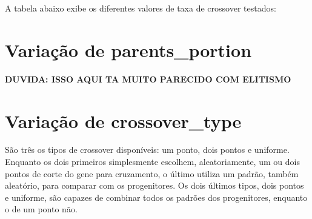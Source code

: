 \documentclass[12pt]{article}
\begin{document}
A tabela abaixo exibe os diferentes valores de taxa de crossover testados:

\section{Variação de parents\_portion}

\textbf{DUVIDA: ISSO AQUI TA MUITO PARECIDO COM ELITISMO}

\section{Variação de crossover\_type}

São três os tipos de crossover disponíveis: um ponto, dois pontos e uniforme. Enquanto os dois primeiros simplesmente escolhem, aleatoriamente, um ou dois pontos de corte do gene para cruzamento, o último utiliza um padrão, também aleatório, para comparar com os progenitores. Os dois últimos tipos, dois pontos e uniforme, são capazes de combinar todos os padrões dos progenitores, enquanto o de um ponto não.
	
	 
	
\end{document}
